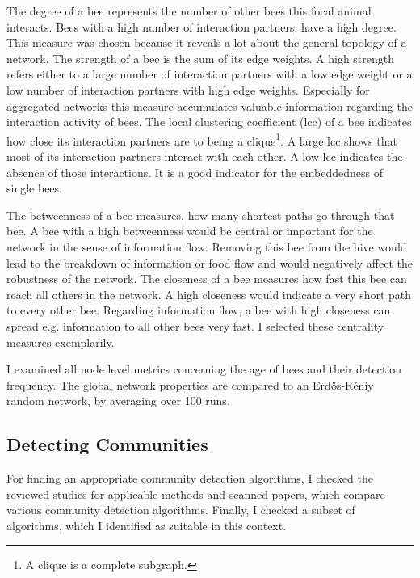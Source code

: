 The degree of a bee represents the number of other bees this focal animal interacts.
Bees with a high number of interaction partners, have a high degree.
This measure was chosen because it reveals a lot about the general topology of a network.
The strength of a bee is the sum of its edge weights. A high strength refers either to a large number of interaction partners with a low edge weight or a low number of interaction partners with high edge weights. Especially for aggregated networks this measure accumulates valuable information regarding the interaction activity of bees.
The local clustering coefficient (lcc) of a bee indicates how close its interaction partners are to being a clique\footnote{A clique is a complete subgraph.}. A large lcc shows that most of its interaction partners interact with each other. A low lcc indicates the absence of those interactions.
It is a good indicator for the embeddedness of single bees.

The betweenness of a bee measures, how many shortest paths go through that bee. A bee with a high betweenness would be central or important for the network in the sense of information flow. Removing this bee from the hive would lead to the breakdown of information or food flow and would negatively affect the robustness of the network.
The closeness of a bee measures how fast this bee can reach all others in the network. A high closeness would indicate a very short path to every other bee. Regarding information flow, a bee with high closeness can spread e.g. information to all other bees very fast.
I selected these centrality measures exemplarily.

I examined all node level metrics concerning the age of bees and their detection frequency. The global network properties are compared to an Erd\H{o}s-R\'{e}niy  random network, by averaging over 100 runs.



\subsection{Detecting Communities}
\label{subsec:APcommunityDet}
For finding an appropriate community detection algorithms, I checked the reviewed studies for applicable methods and scanned papers, which compare various community detection algorithms. Finally, I checked a subset of algorithms, which I identified as suitable in this context.

